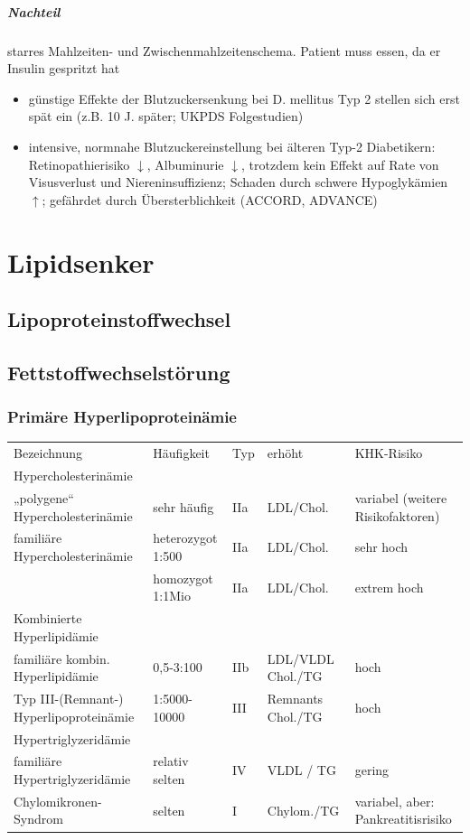 \documentclass[10pt,a4paper]{report}
\begin{document}
\paragraph{Nachteil} %
\label{subp:nachteil}
starres Mahlzeiten- und Zwischenmahlzeitenschema. Patient muss essen, da er Insulin gespritzt hat
\begin{itemize}
	\item günstige Effekte der Blutzuckersenkung bei D. mellitus Typ 2 stellen sich erst spät ein (z.B. 10 J. später; UKPDS Folgestudien)
	\item intensive, normnahe Blutzuckereinstellung bei älteren Typ-2 Diabetikern: Retinopathierisiko $\downarrow$, Albuminurie $\downarrow$, trotzdem kein Effekt auf Rate von Visusverlust und Niereninsuffizienz; Schaden durch schwere Hypoglykämien $\uparrow$; gefährdet durch Übersterblichkeit (ACCORD, ADVANCE)
\end{itemize}
\chapter{Lipidsenker} %
\label{cha:lipidsenker}
\section{Lipoproteinstoffwechsel} %
\label{sec:lipoproteinstoffwechsel}

\section{Fettstoffwechselstörung} %
\label{sec:fettstoffwechselst_rung}
\subsection{Primäre Hyperlipoproteinämie} %
\label{ssub:prim_re_hyperlipoprotein_mie}
\begin{tabularx}{\textwidth}{XXXXX}
Bezeichnung&Häufigkeit&Typ&erhöht&KHK-Risiko\\
Hypercholesterinämie&&&&\\
„polygene“ Hypercholesterinämie&sehr häufig&IIa&LDL/Chol.&variabel (weitere Risikofaktoren)\\				      
familiäre Hypercholesterinämie&heterozygot 1:500&IIa&LDL/Chol.&sehr hoch\\
&homozygot 1:1Mio&IIa&LDL/Chol.&extrem hoch\\
Kombinierte Hyperlipidämie&&&&\\
familiäre kombin. Hyperlipidämie&0,5-3:100&IIb&LDL/VLDL Chol./TG&hoch\\	
Typ III-(Remnant-) Hyperlipoproteinämie&1:5000-10000&III&Remnants Chol./TG&hoch\\
Hypertriglyzeridämie&&&&\\
familiäre Hypertriglyzeridämie&relativ selten&IV&VLDL / TG&gering\\			   			
Chylomikronen-Syndrom&selten&I&Chylom./TG&variabel, aber: Pankreatitisrisiko\\
\end{tabularx}
\end{document}
